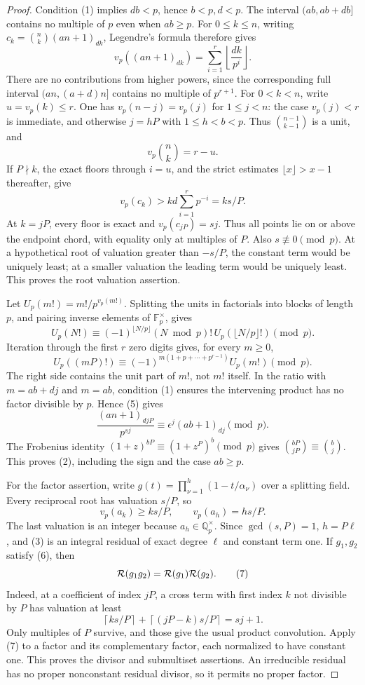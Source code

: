 \documentclass[11pt]{article}
\newcommand{\Q}{\mathbb Q}
\newcommand{\Fp}{\mathbb F_p}
\begin{document}
\begin{proof}
Condition (1) implies $db<p$, hence $b<p,d<p$.
The interval $(ab,ab+db]$ contains no multiple of $p$ even when $ab\ge p$.
For $0\le k\le n$, writing $c_k=\binom nk(an+1)_{dk}$, Legendre's formula
therefore gives
\[
 v_p((an+1)_{dk})=\sum_{i=1}^r\left\lfloor\frac{dk}{p^i}\right\rfloor.
 \tag{4}
\]
There are no contributions from higher powers, since the corresponding
full interval $(an,(a+d)n]$ contains no multiple of $p^{r+1}$.
For $0<k<n$, write $u=v_p(k)\le r$. One has
$v_p(n-j)=v_p(j)$ for $1\le j<n$:
the case $v_p(j)<r$ is immediate, and otherwise $j=hP$ with
$1\le h<b<p$. Thus $\binom{n-1}{k-1}$ is a unit, and
\[
 v_p\binom nk=r-u.
\]
If $P\nmid k$, the exact floors through $i=u$, and the strict estimates
$\lfloor x\rfloor>x-1$ thereafter, give
\[
 v_p(c_k)>k d\sum_{i=1}^rp^{-i}=ks/P.
\]
At $k=jP$, every floor is exact and $v_p(c_{jP})=sj$.
Thus all points lie on or above the endpoint chord, with equality only
at multiples of $P$. Also $s\not\equiv0\pmod p$.
At a hypothetical root of valuation greater than $-s/P$, the constant
term would be uniquely least; at a smaller valuation the leading term
would be uniquely least. This proves the root valuation assertion.

Let $U_p(m!)=m!/p^{v_p(m!)}$. Splitting the units in factorials into
blocks of length $p$, and pairing inverse elements of $\Fp^\times$, gives
\[
 U_p(N!)\equiv
 (-1)^{\lfloor N/p\rfloor}(N\bmod p)!\,
 U_p(\lfloor N/p\rfloor!)\pmod p.
\]
Iteration through the first $r$ zero digits gives, for every $m\ge0$,
\[
 U_p((mP)!)\equiv
 (-1)^{m(1+p+\cdots+p^{r-1})}U_p(m!)\pmod p.
 \tag{5}
\]
The right side contains the unit part of $m!$, not $m!$ itself.
In the ratio with $m=ab+dj$ and $m=ab$, condition (1) ensures
the intervening product has no factor divisible by $p$. Hence (5) gives
\[
 \frac{(an+1)_{djP}}{p^{sj}}
 \equiv\epsilon^j(ab+1)_{dj}\pmod p.
\]
The Frobenius identity
$(1+z)^{bP}\equiv(1+z^P)^b\pmod p$ gives
$\binom{bP}{jP}\equiv\binom bj$.
This proves (2), including the sign and the case $ab\ge p$.

For the factor assertion, write
$g(t)=\prod_{\nu=1}^h(1-t/\alpha_\nu)$ over a splitting field.
Every reciprocal root has valuation $s/P$, so
\[
 v_p(a_k)\ge ks/P,\qquad v_p(a_h)=hs/P.
 \tag{6}
\]
The last valuation is an integer because $a_h\in\Q_p^\times$.
Since $\gcd(s,P)=1$, $h=P\ell$, and (3) is an integral residual
of exact degree $\ell$ and constant term one.
If $g_1,g_2$ satisfy (6), then
\[
 {\cal R}(g_1g_2)={\cal R}(g_1){\cal R}(g_2).
 \tag{7}
\]
Indeed, at a coefficient of index $jP$, a cross term with first index
$k$ not divisible by $P$ has valuation at least
\[
 \left\lceil ks/P\right\rceil+
 \left\lceil(jP-k)s/P\right\rceil=sj+1.
\]
Only multiples of $P$ survive, and those give the usual product
convolution. Apply (7) to a factor and its complementary factor,
each normalized to have constant one. This proves the divisor and
submultiset assertions. An irreducible residual has no proper
nonconstant residual divisor, so it permits no proper factor.
\end{proof}
\end{document}
